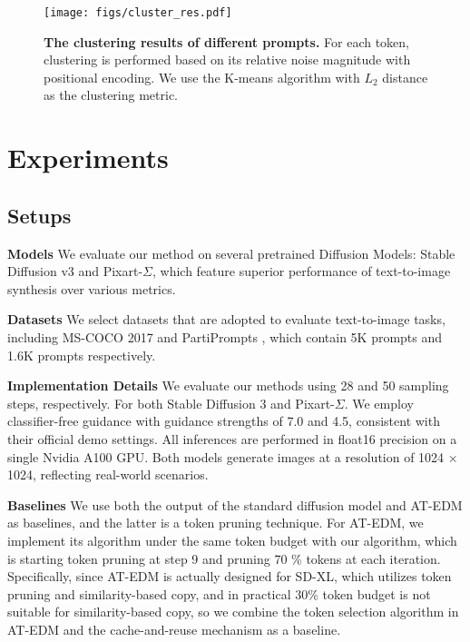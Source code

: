 \documentclass[10pt]{article}
\begin{document}
\vspace{-28.5pt}
\begin{figure}[H]
    \centering
    \texttt{[image: figs/cluster\_res.pdf]}
    \caption{\textbf{The clustering results of different prompts.} For each token, clustering is performed based on its relative noise magnitude with positional encoding. We use the K-means algorithm with $L_2$ distance as the clustering metric. }
    \label{fig:clustering_results}
\end{figure}

\section{Experiments}

\subsection{Setups}
\textbf{Models} We evaluate our method on several pretrained Diffusion Models: Stable Diffusion v3 and Pixart-$\Sigma$, which feature superior performance of text-to-image synthesis over various metrics.

\textbf{Datasets} We select datasets that are adopted to evaluate text-to-image tasks, including MS-COCO 2017\citep{lin2015microsoftcococommonobjects} and PartiPrompts \citep{yu2022scalingautoregressivemodelscontentrich}, which contain 5K prompts and 1.6K prompts respectively.

\textbf{Implementation Details} We evaluate our methods using 28 and 50 sampling steps, respectively. For both Stable Diffusion 3 and Pixart-$\Sigma$. We employ classifier-free guidance \citep{Ho2022ClassifierFreeDG} with guidance strengths of 7.0 and 4.5, consistent with their official demo settings. All inferences are performed in float16 precision on a single Nvidia A100 GPU. Both models generate images at a resolution of 1024 × 1024, reflecting real-world scenarios.

\textbf{Baselines} We use both the output of the standard diffusion model and AT-EDM \citep{wang2024atedm} as baselines, and the latter is a token pruning technique. For AT-EDM, we implement its algorithm under the same token budget with our algorithm, which is starting token pruning at step 9 and pruning 70 \% tokens at each iteration. Specifically, since AT-EDM is actually designed for SD-XL, which utilizes token pruning and similarity-based copy, and in practical 30\% token budget is not suitable for similarity-based copy, so we combine the token selection algorithm in AT-EDM and the cache-and-reuse mechanism as a baseline.
\end{document}

